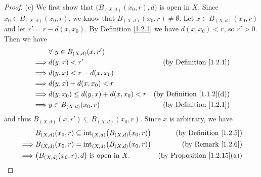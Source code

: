 \begin{proof}{(c)}
    We first show that \(\big(B_{(X, d)}(x_0, r), d\big)\) is open in \(X\).
    Since \(x_0 \in B_{(X, d)}(x_0, r)\), we know that \(B_{(X, d)}(x_0, r) \neq \emptyset\).
    Let \(x \in B_{(X, d)}(x_0, r)\) and let \(r' = r - d(x, x_0)\).
    By Definition \ref{1.2.1} we have \(d(x, x_0) < r\), so \(r' > 0\).
    Then we have
    \begin{align*}
                 & \forall\ y \in B_{(X, d)}(x, r')                                               \\
        \implies & d(y, x) < r'                           & \text{(by Definition \ref{1.2.1})}    \\
        \implies & d(y, x) < r - d(x, x_0)                                                        \\
        \implies & d(y, x) + d(x, x_0) < r                                                        \\
        \implies & d(y, x_0) \leq d(y, x) + d(x, x_0) < r & \text{(by Definition \ref{1.1.2}(d))} \\
        \implies & y \in B_{(X, d)}(x_0, r)               & \text{(by Definition \ref{1.2.1})}
    \end{align*}
    and thus \(B_{(X, d)}(x, r') \subseteq B_{(X, d)}(x_0, r)\).
    Since \(x\) is arbitrary, we have
    \begin{align*}
                 & B_{(X, d)}(x_0, r) \subseteq \text{int}_{(X, d)}\big(B_{(X, d)}(x_0, r)\big) & \text{(by Definition \ref{1.2.5})}      \\
        \implies & B_{(X, d)}(x_0, r) = \text{int}_{(X, d)}\big(B_{(X, d)}(x_0, r)\big)         & \text{(by Remark \ref{1.2.6})}          \\
        \implies & \big(B_{(X, d)}(x_0, r), d\big) \text{ is open in } X.                       & \text{(by Proposition \ref{1.2.15}(a))}
    \end{align*}


\end{proof}
